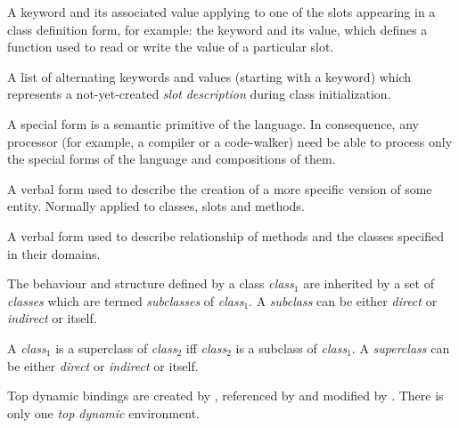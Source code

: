 \begin{optDefinition}
\begin{definitions}
      A keyword and its
    associated value applying to one of the slots appearing in a class
    definition form, for example: the  keyword and its
    value, which defines a function used to read or write the value of a
    particular slot.

      A list
    of alternating keywords and values (starting with a keyword) which
    represents a not-yet-created {\em slot} {\em description} during class
    initialization.

      A special form is a
    semantic primitive of the language.  In consequence, any processor (for
    example, a compiler or a code-walker) need be able to process only the
    special forms of the language and compositions of them.

     A verbal form used to
    describe the creation of a more specific version of some entity.  Normally
    applied to classes, slots and methods.

     A verbal form used
    to describe relationship of methods and the classes specified in their
    domains.

      The behaviour and structure
    defined by a class {\em class$_1$} are inherited by a set of {\em classes}
    which are termed {\em subclasses} of {\em class$_1$}.  A {\em subclass} can
    be either {\em direct} or {\em indirect} or itself.

      A {\em class$_1$} is a
    superclass of {\em class$_2$} iff {\em class$_2$} is a subclass of {\em
        class$_1$}.  A {\em superclass} can be either {\em direct} or {\em
        indirect} or itself.


     Top dynamic bindings
    are created by , referenced by 
    and modified by .  There is only one {\em top
        dynamic} environment.


\end{definitions}
\end{optDefinition}
